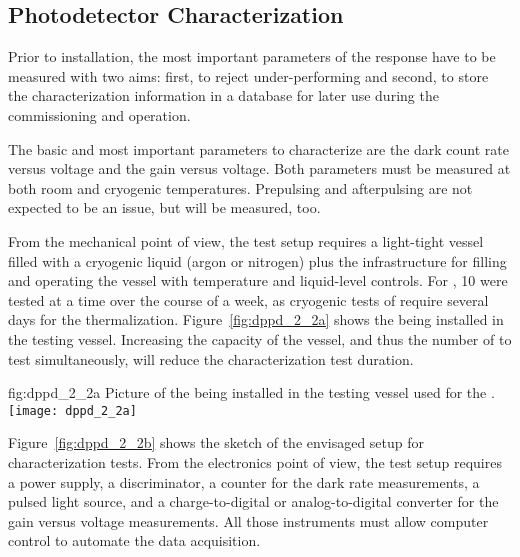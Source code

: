 \subsection{Photodetector Characterization}
\label{sec:fddp-pd-2.2}

Prior to installation, the most important parameters of the  response have to be measured with two aims: first, to reject under-performing  and second, to store the characterization information in a database for later use during the  commissioning and operation.

The basic and most important parameters to characterize are the dark count rate versus voltage and the gain versus voltage. Both parameters must be measured at both room and  cryogenic temperatures. Prepulsing and afterpulsing are not expected to be an issue, but will be measured, too. 

From the mechanical point of view, the test setup requires a light-tight vessel filled with a cryogenic liquid (argon or nitrogen) plus the infrastructure for filling and operating the vessel with temperature and liquid-level controls. For , \num{10}  were tested at a time %
over the course of a week, as cryogenic tests of  
require several days for the  thermalization. Figure~\ref{fig:dppd_2_2a} shows the    being installed in the testing vessel. %
Increasing the capacity of the vessel, and thus the number of  to test simultaneously, %
will reduce the characterization test duration.

\begin{dunefigure}{fig:dppd_2_2a}
{Picture of the  being installed in the testing vessel used for the  .}
\texttt{[image: dppd\_2\_2a]}
\end{dunefigure}

Figure~\ref{fig:dppd_2_2b} shows the sketch of the envisaged setup for  characterization tests. From the electronics point of view, the test setup requires a  power supply, a discriminator, a counter for the dark rate measurements, a pulsed light source, and a charge-to-digital or analog-to-digital converter for the  gain versus voltage measurements. All those instruments must allow computer control to automate the data acquisition.

